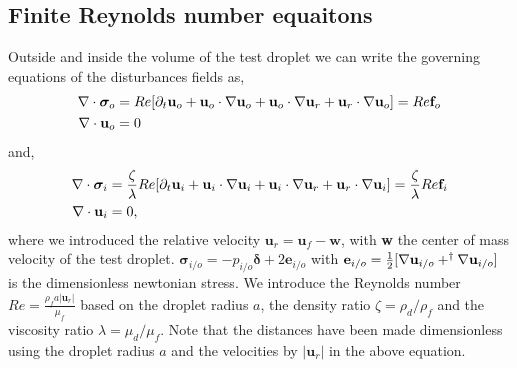 \subsection{Finite Reynolds number equaitons}

Outside and inside the volume of the test droplet we can write the governing equations of the disturbances fields as,  
\begin{align}
    \div\bm\sigma_{o}
    &= 
    Re [
    \pddt \textbf{u}_{o}
    + \textbf{u}_{o}\cdot \grad \textbf{u}_{o}
    + \textbf{u}_{o}\cdot \grad \textbf{u}_r
    + \textbf{u}_r \cdot \grad \textbf{u}_{o}]
    = Re \textbf{f}_{o}
    \label{eq:momentum_out}
    \\
    \div \textbf{u}_{o} &= 0
\end{align}
and, 
\begin{align}
    \div\bm\sigma_{i}
    &= 
    \frac{\zeta}{\lambda}Re [
    \pddt \textbf{u}_{i}
    + \textbf{u}_{i}\cdot \grad \textbf{u}_{i}
    + \textbf{u}_{i}\cdot \grad \textbf{u}_r 
    + \textbf{u}_r \cdot \grad \textbf{u}_{i}]
    = \frac{\zeta}{\lambda}Re \textbf{f}_{i}
    \label{eq:momentum_in}
    \\
    \div \textbf{u}_{i} &= 0,
\end{align}
where we introduced the relative velocity $\textbf{u}_r = \textbf{u}_f - \textbf{w}$, with \textbf{w} the center of mass velocity of the test droplet.  
$\bm\sigma_{i/o} = -p_{i/o}\bm\delta + 2\textbf{e}_{i/o}$ with $\textbf{e}_{i/o} = \frac{1}{2}[\mathbf{\nabla} \textbf{u}_{i/o} + ^{\dagger}\mathbf{\nabla} \textbf{u}_{i/o}]$ is the dimensionless newtonian stress. 
We introduce the Reynolds number $Re = \frac{\rho_f a |\textbf{u}_r|}{\mu_f}$ based on the droplet radius $a$, the density ratio $\zeta = \rho_d / \rho_f$ and the viscosity ratio $\lambda = \mu_d / \mu_f$. 
Note that the distances have been made dimensionless using the droplet radius $a$ and the velocities by $|\textbf{u}_r|$ in the above equation. 


